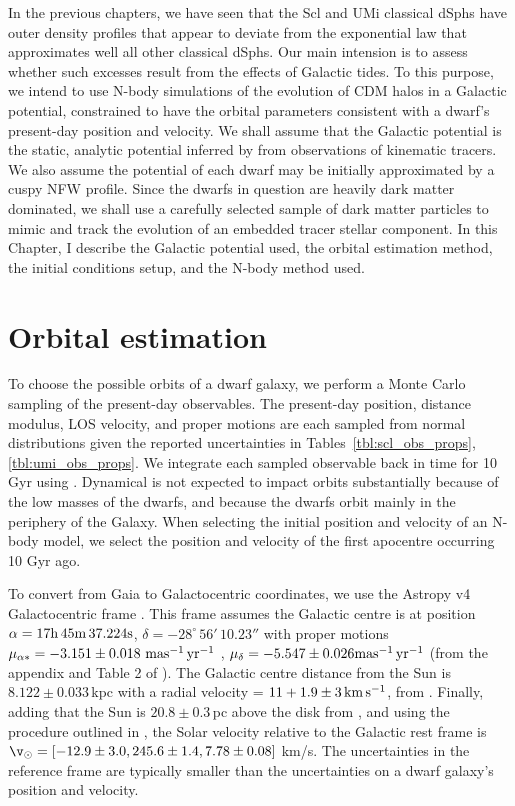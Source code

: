 In the previous chapters, we have seen that the Scl and UMi classical
dSphs have outer density profiles that appear to deviate from the
exponential law that approximates well all other classical dSphs. Our
main intension is to assess whether such excesses result from the
effects of Galactic tides. To this purpose, we intend to use N-body
simulations of the evolution of CDM halos in a Galactic potential,
constrained to have the orbital parameters consistent with a dwarf's
present-day position and velocity. We shall assume that the Galactic
potential is the static, analytic potential inferred by
\citet{mcmillan+2011} from observations of kinematic tracers. We also
assume the potential of each dwarf may be initially approximated by a
cuspy NFW profile. Since the dwarfs in question are heavily dark matter
dominated, we shall use a carefully selected sample of dark matter
particles to mimic and track the evolution of an embedded tracer stellar
component. In this Chapter, I describe the Galactic potential used, the
orbital estimation method, the initial conditions setup, and the N-body
method used.

\section{Orbital estimation}\label{orbital-estimation}

To choose the possible orbits of a dwarf galaxy, we perform a Monte
Carlo sampling of the present-day observables. The present-day position,
distance modulus, LOS velocity, and proper motions are each sampled from
normal distributions given the reported uncertainties in
Tables~\ref{tbl:scl_obs_props}, \ref{tbl:umi_obs_props}. We integrate
each sampled observable back in time for 10 Gyr using \agama [@agama].
Dynamical is not expected to impact orbits substantially because of the
low masses of the dwarfs, and because the dwarfs orbit mainly in the
periphery of the Galaxy. When selecting the initial position and
velocity of an N-body model, we select the position and velocity of the
first apocentre occurring 10 Gyr ago.

To convert from Gaia to Galactocentric coordinates, we use the Astropy
v4 Galactocentric frame \citep{astropycollaboration+2022}. This frame
assumes the Galactic centre is at position
\(\alpha = {\rm 17h\,45m\,37.224s}\),
\(\delta = -28^\circ\,56'\,10.23''\) with proper motions
\(\mu_{\alpha*}=-3.151\pm0.018\ {\rm mas^{-1}\,yr^{-1}}\) ,
\(\mu_\delta=-5.547\pm0.026 {\rm mas^{-1}\,yr^{-1}}\) (from the appendix and Table 2 of
\citet{reid+brunthaler2004}). The Galactic centre distance from the Sun
is \(8.122\pm0.033\,\)kpc with a radial velocity =
\(11 + 1.9 \pm 3\,{\rm km\,s^{-1}}\), from \citet{gravitycollaboration+2018}.
Finally, adding that the Sun is \(20.8\pm0.3\,\)pc above the disk from
\citet{bennett+bovy2019}, and using the procedure outlined in
\citet{drimmel+poggio2018}, the Solar velocity relative to the Galactic
rest frame is
\(\v_\odot = [-12.9 \pm 3.0, 245.6 \pm 1.4, 7.78 \pm 0.08]\) km/s. The
uncertainties in the reference frame are typically smaller than the
uncertainties on a dwarf galaxy's position and velocity.

